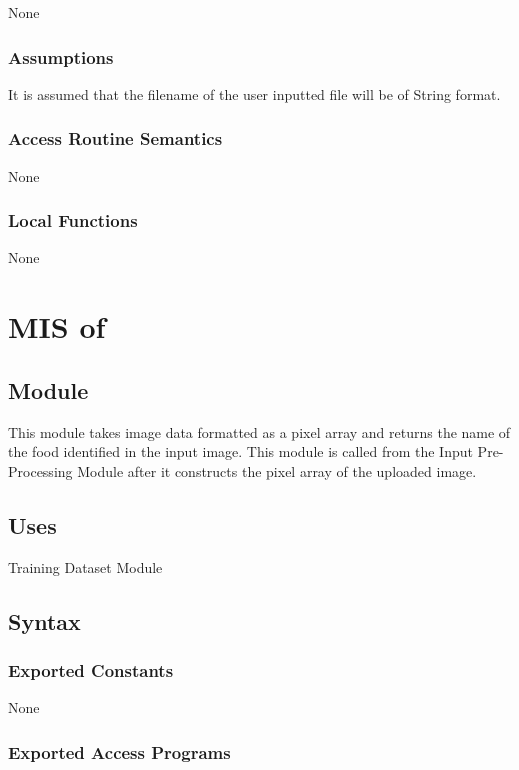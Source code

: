 \documentclass[12pt, titlepage]{article}
\begin{document}
None

\subsubsection{Assumptions}

It is assumed that the filename of the user inputted file will be of String format.

\subsubsection{Access Routine Semantics}

None

\subsubsection{Local Functions}

None

\newpage

\section{MIS of } \label{Module}

\subsection{Module}

This module takes image data formatted as a pixel array and returns the name of the food identified in the input image. This module is called from the Input Pre-Processing Module after it constructs the pixel array of the uploaded image.

\subsection{Uses}

Training Dataset Module

\subsection{Syntax}

\subsubsection{Exported Constants}

None

\subsubsection{Exported Access Programs}
\end{document}
